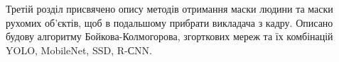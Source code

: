 Третій розділ присвячено опису методів отримання маски людини та маски
рухомих об'єктів, щоб в подальшому прибрати викладача з кадру.
Описано будову алгоритму Бойкова-Колмогорова, згорткових мереж та їх комбінацій
YOLO, MobileNet, SSD, R-СNN.
